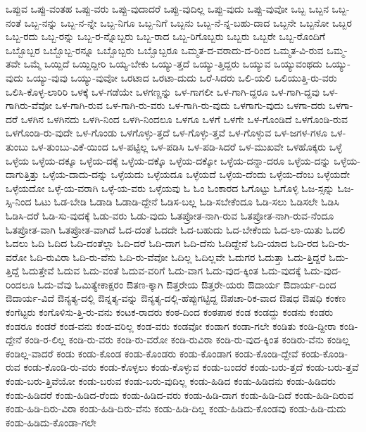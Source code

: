 {ಒಪ್ಪುವ
ಒಪ್ಪು-ವಂತಹ
ಒಪ್ಪು-ವರು
ಒಪ್ಪು-ವುದಾದರೆ
ಒಪ್ಪು-ವುದಿಲ್ಲ
ಒಪ್ಪು-ವುದು
ಒಪ್ಪು-ವುವೋ
ಒಬ್ಬ
ಒಬ್ಬನ
ಒಬ್ಬ-ನಂತೆ
ಒಬ್ಬ-ನನ್ನು
ಒಬ್ಬ-ನ-ನ್ನೇ
ಒಬ್ಬ-ನಿಗೂ
ಒಬ್ಬ-ನಿಗೆ
ಒಬ್ಬನು
ಒಬ್ಬ-ನೆ-ನ್ನ-ಬಹು-ದಾದ
ಒಬ್ಬನೇ
ಒಬ್ಬನೋ
ಒಬ್ಬರ
ಒಬ್ಬ-ರದು
ಒಬ್ಬ-ರನ್ನು
ಒಬ್ಬ-ರ-ನ್ನೊಬ್ಬರು
ಒಬ್ಬ-ರಾದ
ಒಬ್ಬ-ರಿಗೊಬ್ಬರು
ಒಬ್ಬರು
ಒಬ್ಬರೇ
ಒಬ್ಬ-ರೊಂದಿಗೆ
ಒಬ್ಬೊಬ್ಬರ
ಒಬ್ಬೊಬ್ಬ-ರನ್ನೂ
ಒಬ್ಬೊಬ್ಬರು
ಒಬ್ಬೊಬ್ಬರೂ
ಒಮ್ಮತ-ದ-ವರಾದು-ದ-ರಿಂದ
ಒಮ್ಮತ-ವಿ-ರುವ
ಒಮ್ಮ-ತವೇ
ಒಮ್ಮೆ
ಒಯ್ದಿದೆ
ಒಯ್ದಿದ್ದೀರಿ
ಒಯ್ಯ-ಬೇಕು
ಒಯ್ಯು-ತ್ತದೆ
ಒಯ್ಯು-ತ್ತಿದ್ದರು
ಒಯ್ಯುವ
ಒಯ್ಯುವಂಥದು
ಒಯ್ಯು-ವುದು
ಒಯ್ಯು-ವುವು
ಒಯ್ಯು-ವುವೋ
ಒರಟಾದ
ಒರಟಾ-ದುದು
ಒರೆ-ಸಿದರು
ಒಲಿ-ಯಲಿ
ಒಲಿಯುತ್ತಿ-ರು-ವರು
ಒಲಿಸಿ-ಕೊಳ್ಳ-ಲಾರಿರಿ
ಒಳಕ್ಕೆ
ಒಳ-ಗಡೆಯೇ
ಒಳಗಣ್ಣನ್ನು
ಒಳ-ಗಾಗಲೀ
ಒಳ-ಗಾಗಿ-ದ್ದರೂ
ಒಳ-ಗಾಗಿ-ದ್ದವು
ಒಳ-ಗಾಗಿರು-ವೆವೋ
ಒಳ-ಗಾಗಿ-ರುವ
ಒಳ-ಗಾಗಿ-ರು-ವರು
ಒಳ-ಗಾಗಿ-ರು-ವುದು
ಒಳಗಾಗು-ವುದು
ಒಳಗಾ-ದರು
ಒಳಗಾ-ದರೆ
ಒಳಗಿನ
ಒಳಗಿನದು
ಒಳಗಿ-ನಿಂದ
ಒಳಗಿ-ನಿಂದಲೂ
ಒಳಗೂ
ಒಳಗೆ
ಒಳಗೇ
ಒಳ-ಗೊಂಡಿದೆ
ಒಳಗೊಂಡಿ-ರುವ
ಒಳಗೊಂಡಿ-ರು-ವುದೇ
ಒಳ-ಗೊಂಡು
ಒಳಗೊಳ್ಳು-ತ್ತದೆ
ಒಳ-ಗೊಳ್ಳು-ತ್ತವೆ
ಒಳ-ಗೊಳ್ಳುವ
ಒಳ-ಜಗಳ-ಗಳೂ
ಒಳ-ತುಂಬು
ಒಳ-ತುಂಬು-ವಿಕೆ-ಯಿಂದ
ಒಳ-ಪಟ್ಟಿಲ್ಲ
ಒಳ-ಪಡಿಸಿ
ಒಳ-ಪಡಿ-ಸಿದರೆ
ಒಳ-ಮುಖವೇ
ಒಳಹೊಕ್ಕರು
ಒಳ್ಳೆ
ಒಳ್ಳೆಯ
ಒಳ್ಳೆಯ-ದಕ್ಕೂ
ಒಳ್ಳೆಯ-ದಕ್ಕೆ
ಒಳ್ಳೆಯ-ದಕ್ಕೊ
ಒಳ್ಳೆಯ-ದಕ್ಕೋ
ಒಳ್ಳೆಯ-ದನ್ನಾ-ದರೂ
ಒಳ್ಳೆಯ-ದನ್ನು
ಒಳ್ಳೆಯ-ದಾಗುತ್ತಿತ್ತು
ಒಳ್ಳೆಯ-ದಾದು-ದನ್ನು
ಒಳ್ಳೆಯದು
ಒಳ್ಳೆಯದೂ
ಒಳ್ಳೆಯದೆ
ಒಳ್ಳೆಯ-ದೆಂದು
ಒಳ್ಳೆಯ-ದೆಂಬ
ಒಳ್ಳೆಯದೇ
ಒಳ್ಳೆಯದೋ
ಒಳ್ಳೆ-ಯ-ವರಾಗಿ
ಒಳ್ಳೆ-ಯ-ವರು
ಒಳ್ಳೆಯವು
ಓ
ಓಂ
ಓಂಕಾರದ
ಓಗೊಟ್ಟು
ಓಗೊಳ್ಳಿ
ಓಜ-ಸ್ಸನ್ನು
ಓಜ-ಸ್ಸಿ-ನಿಂದ
ಓಟು
ಓಡ-ಬೇಡಿ
ಓಡಾಡಿ
ಓಡಾಡಿ-ದ್ದೇನೆ
ಓಡಿಸ-ಬಲ್ಲ
ಓಡಿ-ಸಬೇಕೆಂದೂ
ಓಡಿ-ಸಲು
ಓಡಿಸಲೇ
ಓಡಿಸಿ
ಓಡಿಸಿ-ದರೆ
ಓಡಿ-ಸು-ವುದಕ್ಕೆ
ಓಡು-ವರು
ಓಡು-ವುದು
ಓತಪ್ರೋತ-ನಾಗಿ-ರುವ
ಓತಪ್ರೋತ-ನಾಗಿ-ರುವ-ನೆಂದೂ
ಓತಪ್ರೋತ-ವಾಗಿ
ಓತಪ್ರೋತ-ವಾಗಿದೆ
ಓದ-ದಂತೆ
ಓದದೇ
ಓದ-ಬಹುದು
ಓದ-ಬೇಕೆಂದು
ಓದ-ಲಾ-ಯಿತು
ಓದಲಿ
ಓದಲು
ಓದಿ
ಓದಿದ
ಓದಿ-ದಂತೆಲ್ಲಾ
ಓದಿ-ದರೆ
ಓದಿ-ದಾಗ
ಓದಿ-ದೆನು
ಓದಿದ್ದೇನೆ
ಓದಿ-ಯಾದ
ಓದಿ-ರದ
ಓದಿ-ರು-ವರೋ
ಓದಿ-ರುವಿರಾ
ಓದಿ-ರು-ವೆನು
ಓದಿ-ರು-ವೆವೋ
ಓದಿಲ್ಲ
ಓದಿಲ್ಲವೇ
ಓದುಗರ
ಓದುತ್ತಾ
ಓದು-ತ್ತಿದ್ದರೆ
ಓದು-ತ್ತಿದ್ದೆ
ಓದುತ್ತೇವೆ
ಓದುವ
ಓದು-ವಂತೆ
ಓದುವ-ವರಿಗೆ
ಓದು-ವಾಗ
ಓದು-ವುದ-ಕ್ಕಿಂತ
ಓದು-ವುದಕ್ಕೆ
ಓದು-ವುದ-ರಿಂದಲೂ
ಓದು-ವೆವು
ಓಮಿತ್ಯೇಕಾಕ್ಷರಂ
ಔತಣ-ಕ್ಕಾಗಿ
ಔತ್ತರೇಯ
ಔತ್ತರೇ-ಯರು
ಔದಾರ್ಯ
ಔದಾರ್ಯ-ದಿಂದ
ಔದಾರ್ಯ-ವಿದೆ
ಔನ್ಯತ್ಯ-ದಲ್ಲಿ
ಔನ್ನತ್ಯ-ವನ್ನು
ಔನ್ಯತ್ಯ-ದಲ್ಲಿ-ಹೆಪ್ಪುಗಟ್ಟಿದ್ದ
ಔಪಚಾ-ರಿಕ-ವಾದ
ಔಷಧ
ಔಷಧಿ
ಕಂಕಣ
ಕಂಗೆಟ್ಟರು
ಕಂಗೊಳಿಸು-ತ್ತಿ-ರು-ವನು
ಕಂಟಕ-ರಾದರು
ಕಂಠ-ದಿಂದ
ಕಂಠಪಾಠ
ಕಂಡ
ಕಂಡದ್ದು
ಕಂಡನು
ಕಂಡರು
ಕಂಡರೂ
ಕಂಡರೆ
ಕಂಡ-ವನು
ಕಂಡ-ವರಿಲ್ಲ
ಕಂಡ-ವರು
ಕಂಡವೋ
ಕಂಡಾಗ
ಕಂಡಾ-ಗಲೇ
ಕಂಡಿತು
ಕಂಡಿ-ದ್ದೀರಾ
ಕಂಡಿ-ದ್ದೇನೆ
ಕಂಡಿ-ರ-ಲಿಲ್ಲ
ಕಂಡಿ-ರು-ವರು
ಕಂಡಿ-ರು-ವರೋ
ಕಂಡಿ-ರುವಿರಾ
ಕಂಡಿ-ರು-ವುದ-ಕ್ಕಿಂತ
ಕಂಡಿರು-ವೆನು
ಕಂಡಿಲ್ಲ
ಕಂಡಿಲ್ಲ-ವಾದರೆ
ಕಂಡು
ಕಂಡು-ಕೊಂಡ
ಕಂಡು-ಕೊಂಡರು
ಕಂಡು-ಕೊಂಡಾಗ
ಕಂಡು-ಕೊಂಡಿ-ದ್ದೇವೆ
ಕಂಡು-ಕೊಂಡಿ-ರುವ
ಕಂಡು-ಕೊಂಡಿ-ರು-ವರು
ಕಂಡು-ಕೊಳ್ಳಲು
ಕಂಡು-ಕೊಳ್ಳುವ
ಕಂಡು-ಬಂದರೆ
ಕಂಡು-ಬರು-ತ್ತದೆ
ಕಂಡು-ಬರು-ತ್ತವೆ
ಕಂಡು-ಬರು-ತ್ತಿವೆಯೋ
ಕಂಡು-ಬರುವ
ಕಂಡು-ಬರು-ವುದಿಲ್ಲ
ಕಂಡು-ಹಿಡಿದ
ಕಂಡು-ಹಿಡಿದನು
ಕಂಡು-ಹಿಡಿದರು
ಕಂಡು-ಹಿಡಿದರೆ
ಕಂಡು-ಹಿಡಿದ-ರೆಂದು
ಕಂಡು-ಹಿಡಿದ-ವರು
ಕಂಡು-ಹಿಡಿ-ದಾಗ
ಕಂಡು-ಹಿಡಿ-ದಿದೆ
ಕಂಡು-ಹಿಡಿ-ದಿರುವ
ಕಂಡು-ಹಿಡಿ-ದಿರು-ವಿರಾ
ಕಂಡು-ಹಿಡಿ-ದಿರು-ವೆನು
ಕಂಡು-ಹಿಡಿ-ದಿಲ್ಲ
ಕಂಡು-ಹಿಡಿದು-ಕೊಂಡವು
ಕಂಡು-ಹಿಡಿ-ದುದು
ಕಂಡು-ಹಿಡಿದು-ಕೊಂಡಾ-ಗಲೇ
}
